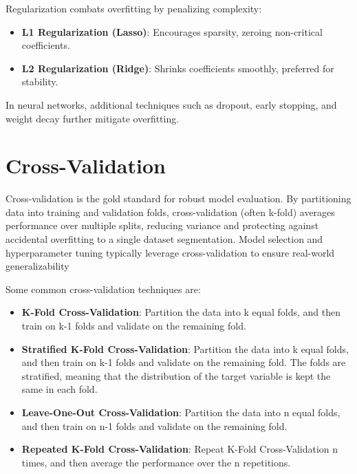 Regularization combats overfitting by penalizing complexity:

\begin{itemize}

    \item \textbf{L1 Regularization (Lasso)}: Encourages sparsity, zeroing non-critical coefficients.
    \item \textbf{L2 Regularization (Ridge)}: Shrinks coefficients smoothly, preferred for stability.

\end{itemize}

In neural networks, additional techniques such as dropout, early stopping, and weight decay further mitigate overfitting.

\section{Cross-Validation}

Cross-validation is the gold standard for robust model evaluation.
By partitioning data into training and validation folds, cross-validation (often k-fold) averages performance over multiple splits, reducing variance and protecting against accidental overfitting to a single dataset segmentation.
Model selection and hyperparameter tuning typically leverage cross-validation to ensure real-world generalizability

Some common cross-validation techniques are:

\begin{itemize}
    \item \textbf{K-Fold Cross-Validation}: Partition the data into k equal folds, and then train on k-1 folds and validate on the remaining fold.

    \item \textbf{Stratified K-Fold Cross-Validation}: Partition the data into k equal folds, and then train on k-1 folds and validate on the remaining fold.
        The folds are stratified, meaning that the distribution of the target variable is kept the same in each fold.

    \item \textbf{Leave-One-Out Cross-Validation}: Partition the data into n equal folds, and then train on n-1 folds and validate on the remaining fold.

    \item \textbf{Repeated K-Fold Cross-Validation}: Repeat K-Fold Cross-Validation n times, and then average the performance over the n repetitions.
\end{itemize}


